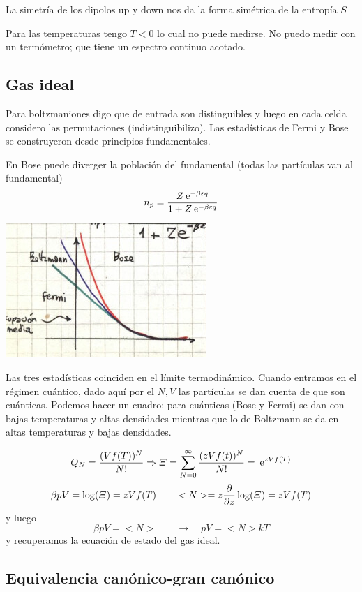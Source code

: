 \documentclass[10pt,oneside]{CBFT_book}
\begin{document}
La simetría de los dipolos up y down nos da la forma simétrica de la entropía $S$

Para las temperaturas tengo $T<0$ lo cual no puede medirse. No puedo medir con un termómetro; que
tiene un espectro continuo acotado.


\subsection{Gas ideal}

Para boltzmaniones digo que de entrada son distinguibles y luego en cada celda considero las permutaciones
(indistinguibilizo). Las estadísticas de Fermi y Bose se construyeron desde principios fundamentales.

En Bose puede diverger la población del fundamental (todas las partículas van al fundamental)
\[
	n_p = \frac{ Z \:\mathrm{e}^{ -\beta \varepsilon q } }{ 1 + Z \:\mathrm{e}^{ - \beta \varepsilon q } }
\]

\includegraphics[scale=0.5]{images/1606329475.jpg}

Las tres estadísticas coinciden en el límite termodinámico.
Cuando entramos en el régimen cuántico, dado aquí por el $N,V$ las partículas se dan cuenta de que son
cuánticas. Podemos hacer un cuadro: para cuánticas (Bose y Fermi) se dan con bajas temperaturas y
altas densidades mientras que lo de Boltzmann se da en altas temperaturas y bajas densidades.

\[
	Q_N = \frac{(Vf(T))^N}{N!} \Rightarrow \Xi = \sum_{N=0}^\infty \frac{(zVf(t))^N}{N!} = \:\mathrm{e}^{zVf(T)}
\]
\[
	\beta pV = \log (\Xi) = zVf(T) \qquad <N> = z \frac{\partial^{\hspace{-0.05em}} {}}{\partial {z}^{\hspace{-0.05em}}} \log (\Xi) = zVf(T)
\]
y luego 
\[
	\beta pV = <N> \qquad \rightarrow \quad pV = <N> k T
\]
y recuperamos la ecuación de estado del gas ideal.


\subsection{Equivalencia canónico-gran canónico}
\end{document}
